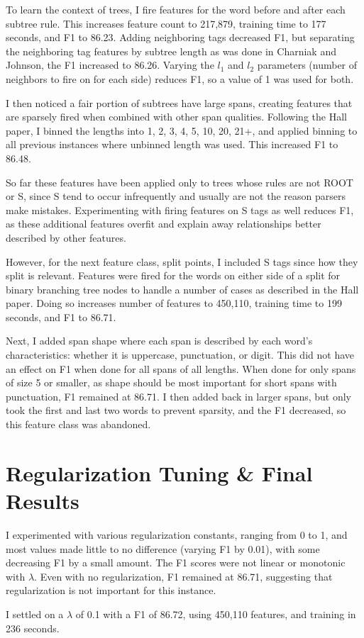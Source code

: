 \documentclass[11pt]{article}
\begin{document}
To learn the context of trees, I fire features for the word before and after each subtree rule.
This increases feature count to 217,879, training time to 177 seconds, and F1 to 86.23.
Adding neighboring tags decreased F1, but separating the neighboring tag features by subtree
length as was done in Charniak and Johnson, the F1 increased to 86.26. Varying the $l_1$ and $l_2$
parameters (number of neighbors to fire on for each side) reduces F1, so a value of 1 was used
for both.

I then noticed a fair portion of subtrees have large spans, creating features that are sparsely
fired when combined with other span qualities. Following the Hall paper, I binned the lengths
into 1, 2, 3, 4, 5, 10, 20, 21+, and applied binning to all previous instances where unbinned
length was used. This increased F1 to 86.48.

So far these features have been applied only to trees whose rules are not ROOT or S, since
S tend to occur infrequently and usually are not the reason parsers make mistakes. Experimenting
with firing features on S tags as well reduces F1, as these additional features overfit and
explain away relationships better described by other features.

However, for the next feature class, split points, I included S tags since how they split is
relevant. Features were fired for the words on either side of a split for binary branching
tree nodes to handle a number of cases as described in the Hall paper. Doing so increases
number of features to 450,110, training time to 199 seconds, and F1 to 86.71.

Next, I added span shape where each span is described by each word's characteristics: whether
it is uppercase, punctuation, or digit. This did not have an effect on F1 when done for all
spans of all lengths. When done for only spans of size 5 or smaller, as shape should be most
important for short spans with punctuation, F1 remained at 86.71. I then added back in larger
spans, but only took the first and last two words to prevent sparsity, and the F1 decreased, so
this feature class was abandoned.

\section{Regularization Tuning & Final Results}

I experimented with various regularization constants, ranging from 0 to 1, and most values
made little to no difference (varying F1 by 0.01), with some decreasing F1 by a small amount. 
The F1 scores were not linear or monotonic with $\lambda$. 
Even with no regularization, F1 remained at 86.71, suggesting that regularization is not important
for this instance.

I settled on a $\lambda$ of 0.1 with a F1 of 86.72, using 450,110 features, and training in
236 seconds.
\end{document}
